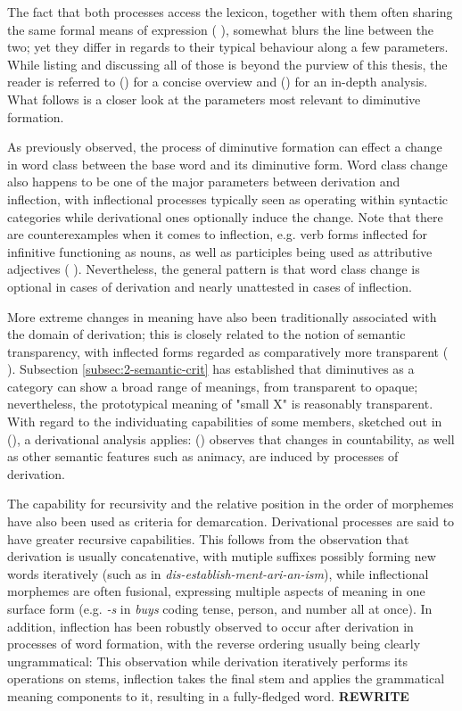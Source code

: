 The fact that both processes access the lexicon, together with them often sharing the same formal means of expression (\citeauthor{Booij+2000} \citeyear{Booij+2000}), somewhat blurs the line between the two; yet they differ in regards to their typical behaviour along a few parameters. While listing and discussing all of those is beyond the purview of this thesis, the reader is referred to \citeauthor{Booij+2000} (\citeyear{Booij+2000}) for a concise overview and \citeauthor{Scalise+1986} (\citeyear{Scalise+1986}) for an in-depth analysis. What follows is a closer look at the parameters most relevant to diminutive formation.

 As previously observed, the process of diminutive formation can effect a change in word class between the base word and its diminutive form. Word class change also happens to be one of the major parameters between derivation and inflection, with inflectional processes typically seen as operating within syntactic categories while derivational ones optionally induce the change. Note that there are counterexamples when it comes to inflection, e.g. verb forms inflected for infinitive functioning as nouns, as well as participles being used as attributive adjectives (\citeauthor{Booij+2000} \citeyear{Booij+2000}). Nevertheless, the general pattern is that word class change is optional in cases of derivation and nearly unattested in cases of inflection.

 More extreme changes in meaning have also been traditionally associated with the domain of derivation; this is closely related to the notion of semantic transparency, with inflected forms regarded as comparatively more transparent (\citeauthor{Booij+2000} \citeyear{Booij+2000}). Subsection \ref{subsec:2-semantic-crit} has established that diminutives as a category can show a broad range of meanings, from transparent to opaque; nevertheless, the prototypical meaning of "small X" is reasonably transparent. With regard to the individuating capabilities of some members, sketched out in \citeauthor{Wiltschko+2006} (\citeyear{Wiltschko+2006}), a derivational analysis applies: \citeauthor{Scalise+1986} (\citeyear{Scalise+1986}) observes that changes in countability, as well as other semantic features such as animacy, are induced by processes of derivation.

The capability for recursivity and the relative position in the order of morphemes have also been used as criteria for demarcation. Derivational processes are said to have greater recursive capabilities. This follows from the observation that derivation is usually concatenative, with mutiple suffixes possibly forming new words iteratively (such as in \textit{dis-establish-ment-ari-an-ism}), while inflectional morphemes are often fusional, expressing multiple aspects of meaning in one surface form (e.g. \textit{-s} in \textit{buys} coding tense, person, and number all at once). In addition, inflection has been robustly observed to occur after derivation in processes of word formation, with the reverse ordering usually being clearly ungrammatical:      
This observation  while derivation iteratively performs its operations on stems, inflection takes the final stem and applies the grammatical meaning components to it, resulting in a fully-fledged word. \textbf{REWRITE}

